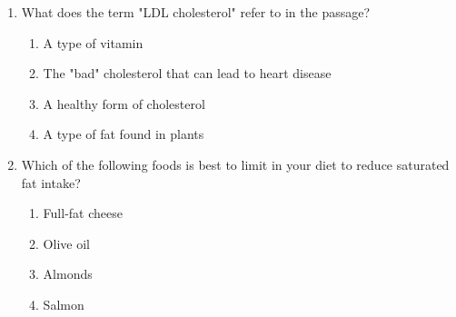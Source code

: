 \documentclass[12pt]{article}
\begin{document}
\begin{enumerate}
    \item What does the term "LDL cholesterol" refer to in the passage?
    \begin{enumerate}[label=\Alph*.]
        \item A type of vitamin
        \item The "bad" cholesterol that can lead to heart disease
        \item A healthy form of cholesterol
        \item A type of fat found in plants
    \end{enumerate}
    \vspace{0.5cm}

    \item Which of the following foods is best to limit in your diet to reduce saturated fat intake?
    \begin{enumerate}[label=\Alph*.]
        \item Full-fat cheese
        \item Olive oil
        \item Almonds
        \item Salmon
    \end{enumerate}
    \vspace{0.5cm}

\end{enumerate}
\end{document}
